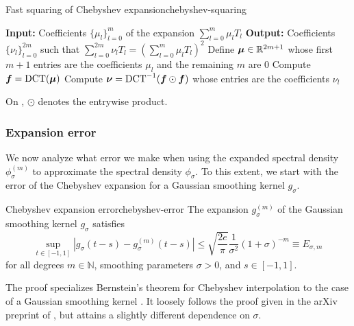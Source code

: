 \begin{algo}{Fast squaring of Chebyshev expansion}{chebyshev-squaring}
    \begin{algorithmic}[1]
        \Statex \textbf{Input:} Coefficients $\{ \mu_l \}_{l=0}^{m}$ of the expansion $\sum_{l=0}^{m} \mu_l T_l$
        \Statex \textbf{Output:} Coefficients $\{ \nu_l \}_{l=0}^{2m}$ such that $\sum_{l=0}^{2m} \nu_l T_l = (\sum_{l=0}^{m} \mu_l T_l)^2$
        \State Define $\boldsymbol{\mu} \in \mathbb{R}^{2m + 1}$ whose first $m + 1$ entries are the coefficients $\mu_l$ and the remaining $m$ are $0$
    \State Compute $\boldsymbol{f} = \operatorname{DCT}(\boldsymbol{\mu})$
    \State Compute $\boldsymbol{\nu} = \operatorname{DCT}^{-1}(\boldsymbol{f} \odot \boldsymbol{f})$ whose entries are the coefficients $\nu_l$
    \label{lin:inverse-DCT}
    \end{algorithmic}
\end{algo}
On , $\odot$ denotes the entrywise product.

\subsubsection{Expansion error}
\label{subsubsec:expansion-error}

We now analyze what error we make when using the expanded spectral density $\phi_{\sigma}^{(m)}$ to approximate the spectral density $\phi_{\sigma}$. To this extent, we start with the error of the Chebyshev expansion for a Gaussian smoothing kernel $g_{\sigma}$.

\begin{lemma}{Chebyshev expansion error}{chebyshev-error}
    The expansion $g_{\sigma}^{(m)}$ of the Gaussian smoothing kernel $g_{{\sigma}}$  satisfies
    \begin{equation}
        \sup_{t \in [-1, 1]} \left| g_{\sigma}(t - s) - g_{\sigma}^{(m)}(t - s) \right| \leq \sqrt{\frac{2e}{\pi}} \frac{1}{\sigma^2} (1 + \sigma)^{-m} \equiv E_{\sigma, m}
        \label{equ:chebyshev-interpolation-sup-error-kernel}
    \end{equation}
    for all degrees $m \in \mathbb{N}$, smoothing parameters $\sigma > 0$, and $s \in [-1, 1]$.
\end{lemma}

The proof specializes Bernstein's theorem for Chebyshev interpolation to the case of a Gaussian smoothing kernel . It loosely follows the proof given in the arXiv preprint of \cite[theorem 2]{lin-2017-randomized-estimation}, but attains a slightly different dependence on $\sigma$.

